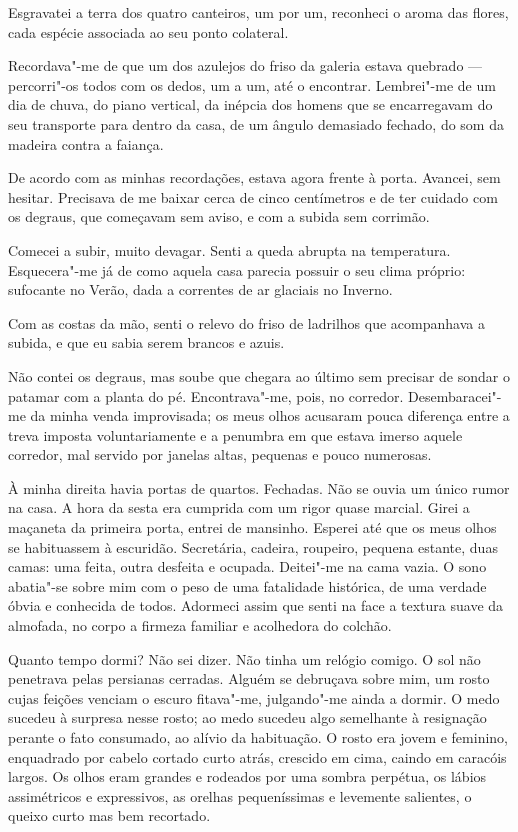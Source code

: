 Esgravatei a terra dos quatro canteiros, um por um, reconheci o aroma
das flores, cada espécie associada ao seu ponto colateral.

Recordava"-me de que um dos azulejos do friso da galeria estava
quebrado --- percorri"-os todos com os dedos, um a um, até o encontrar.
Lembrei"-me de um dia de chuva, do piano vertical, da inépcia dos homens
que se encarregavam do seu transporte para dentro da casa, de um ângulo
demasiado fechado, do som da madeira contra a faiança.

De acordo com as minhas recordações, estava agora frente à porta.
Avancei, sem hesitar. Precisava de me baixar cerca
de cinco centímetros e de ter cuidado com os degraus, que começavam sem
aviso, e com a subida sem corrimão.

Comecei a subir, muito devagar. Senti a queda abrupta na temperatura.
Esquecera"-me já de como aquela casa parecia possuir o seu clima próprio:
sufocante no Verão, dada a correntes de ar glaciais no Inverno.

Com as costas da mão, senti o relevo do friso de ladrilhos que
acompanhava a subida, e que eu sabia serem brancos e azuis.

Não contei os degraus, mas soube que chegara ao último sem precisar de
sondar o patamar com a planta do pé. Encontrava"-me, pois, no corredor.
Desembaracei"-me da minha venda improvisada; os meus olhos acusaram pouca
diferença entre a treva imposta voluntariamente e a penumbra em que
estava imerso aquele corredor, mal servido por janelas altas, pequenas e
pouco numerosas.

À minha direita havia portas de quartos. Fechadas. Não se ouvia um único
rumor na casa. A hora da sesta era cumprida com um rigor quase
marcial. Girei a maçaneta da primeira porta, entrei de mansinho. Esperei
até que os meus olhos se habituassem à escuridão. Secretária, cadeira,
roupeiro, pequena estante, duas camas: uma feita, outra desfeita e
ocupada. Deitei"-me na cama vazia. O sono abatia"-se sobre mim com o peso
de uma fatalidade histórica, de uma verdade óbvia e conhecida de
todos. Adormeci assim que senti na face a textura suave da almofada, no
corpo a firmeza familiar e acolhedora do colchão.

Quanto tempo dormi? Não sei dizer. Não tinha um relógio comigo. O sol
não penetrava pelas persianas cerradas. Alguém se debruçava sobre mim,
um rosto cujas feições venciam o escuro fitava"-me, julgando"-me ainda a
dormir.
O medo sucedeu à surpresa nesse rosto; ao medo sucedeu algo semelhante à
resignação perante o fato consumado, ao alívio da habituação. O rosto
era jovem e feminino, enquadrado por cabelo cortado curto atrás,
crescido em cima, caindo em caracóis largos. Os olhos eram grandes e
rodeados por uma sombra perpétua, os lábios assimétricos e
expressivos, as orelhas pequeníssimas e levemente salientes, o queixo
curto mas bem recortado.

